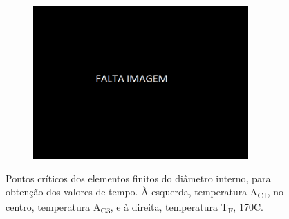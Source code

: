 \begin{figure}[htb]
\begin{subfigure}{.33\textwidth}
        \caption{}
        \label{fig:A1_Dint}
    \end{subfigure}
    \begin{subfigure}{.33\textwidth}
        \centering
        \includegraphics[width = 0.9\textwidth]{Figures/Cap4/Falta_Imagem.png}
        \caption{}
        \label{fig:Tf_Dint}
    \end{subfigure}
    \caption[Pontos críticos dos elementos finitos do diâmetro interno]%
    {Pontos críticos dos elementos finitos do diâmetro interno, para obtenção dos valores de tempo. À esquerda, temperatura A\textsubscript{C1}, no centro, temperatura A\textsubscript{C3}, e à direita, temperatura T\textsubscript{F}, 170\textdegree C.}
    \label{fig:Diametro}
\end{figure}
